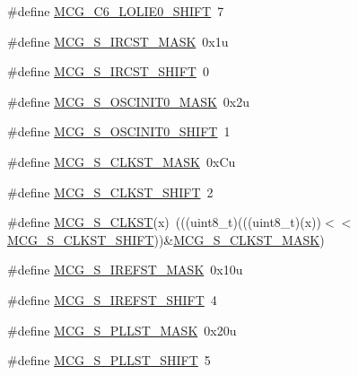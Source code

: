 \begin{DoxyCompactItemize}
\item 
\#define \hyperlink{group___m_c_g___register___masks_gaf62eb94fa38802a5950bd616b539a69c}{M\+C\+G\+\_\+\+C6\+\_\+\+L\+O\+L\+I\+E0\+\_\+\+S\+H\+I\+FT}~7
\item 
\#define \hyperlink{group___m_c_g___register___masks_ga1c693472984fb69650b117ffe5b76da5}{M\+C\+G\+\_\+\+S\+\_\+\+I\+R\+C\+S\+T\+\_\+\+M\+A\+SK}~0x1u
\item 
\#define \hyperlink{group___m_c_g___register___masks_ga9abb1ad8f00a085572bb58ab815b7afd}{M\+C\+G\+\_\+\+S\+\_\+\+I\+R\+C\+S\+T\+\_\+\+S\+H\+I\+FT}~0
\item 
\#define \hyperlink{group___m_c_g___register___masks_ga75a97c37fbe3689889ea81fd04f13805}{M\+C\+G\+\_\+\+S\+\_\+\+O\+S\+C\+I\+N\+I\+T0\+\_\+\+M\+A\+SK}~0x2u
\item 
\#define \hyperlink{group___m_c_g___register___masks_ga3680bc3a628991bb5279d9d6b938b374}{M\+C\+G\+\_\+\+S\+\_\+\+O\+S\+C\+I\+N\+I\+T0\+\_\+\+S\+H\+I\+FT}~1
\item 
\#define \hyperlink{group___m_c_g___register___masks_gaf43507c78cdda211a04b5ae0509edb2e}{M\+C\+G\+\_\+\+S\+\_\+\+C\+L\+K\+S\+T\+\_\+\+M\+A\+SK}~0x\+Cu
\item 
\#define \hyperlink{group___m_c_g___register___masks_gab0768a667adb2dc2e1fb7972f9fd85a4}{M\+C\+G\+\_\+\+S\+\_\+\+C\+L\+K\+S\+T\+\_\+\+S\+H\+I\+FT}~2
\item 
\#define \hyperlink{group___m_c_g___register___masks_ga891e8f2d733bebc7ab21cf49e0473b24}{M\+C\+G\+\_\+\+S\+\_\+\+C\+L\+K\+ST}(x)~(((uint8\+\_\+t)(((uint8\+\_\+t)(x))$<$$<$\hyperlink{group___m_c_g___register___masks_gab0768a667adb2dc2e1fb7972f9fd85a4}{M\+C\+G\+\_\+\+S\+\_\+\+C\+L\+K\+S\+T\+\_\+\+S\+H\+I\+FT}))\&\hyperlink{group___m_c_g___register___masks_gaf43507c78cdda211a04b5ae0509edb2e}{M\+C\+G\+\_\+\+S\+\_\+\+C\+L\+K\+S\+T\+\_\+\+M\+A\+SK})
\item 
\#define \hyperlink{group___m_c_g___register___masks_ga5bf822a90d9c1e67d5297420157e1dd0}{M\+C\+G\+\_\+\+S\+\_\+\+I\+R\+E\+F\+S\+T\+\_\+\+M\+A\+SK}~0x10u
\item 
\#define \hyperlink{group___m_c_g___register___masks_ga4a2727883c339845e709dacc0c2fd71a}{M\+C\+G\+\_\+\+S\+\_\+\+I\+R\+E\+F\+S\+T\+\_\+\+S\+H\+I\+FT}~4
\item 
\#define \hyperlink{group___m_c_g___register___masks_ga6f176d95968a5b7b1af67ae81734c854}{M\+C\+G\+\_\+\+S\+\_\+\+P\+L\+L\+S\+T\+\_\+\+M\+A\+SK}~0x20u
\item 
\#define \hyperlink{group___m_c_g___register___masks_gafddddab311f8f0cb58e7b7941f6d9a8d}{M\+C\+G\+\_\+\+S\+\_\+\+P\+L\+L\+S\+T\+\_\+\+S\+H\+I\+FT}~5
$$
\end{DoxyCompactItemize}
